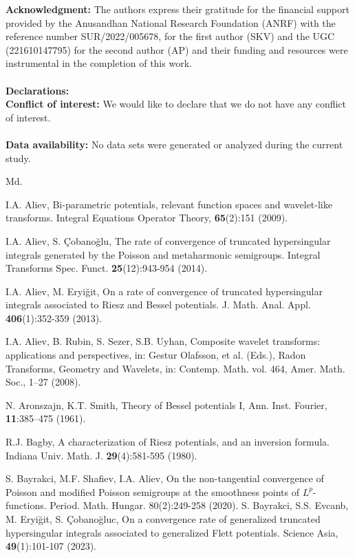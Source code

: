 \documentclass[11pt,a4paper,reqno]{amsproc}
\theoremstyle{definition}
\theoremstyle{remark}
\numberwithin{equation}{section}
\begin{document}
\noindent\textbf{Acknowledgment:}
The authors express their gratitude for the financial support provided by the Anusandhan National Research Foundation (ANRF) with the reference number SUR/2022/005678, for the first author (SKV) and the UGC (221610147795) for the second author (AP) and their funding and resources were instrumental in the completion of this work. \\  
\\
\textbf{Declarations:}\\
\textbf{Conflict of interest:}
We would like to declare that we do not have any conflict of interest.\\ \\
\textbf{Data availability:}
No data sets were generated or analyzed during the current study.
 
\begin{thebibliography}{Md.}

 I.A. Aliev, Bi-parametric potentials, relevant function spaces and wavelet-like transforms. Integral Equations Operator Theory, \textbf{65}(2):151 (2009).

 I.A. Aliev,  S. Çobano\u{g}lu, The rate of convergence of truncated hypersingular integrals generated by the Poisson and metaharmonic semigroups. Integral Transforms Spec. Funct. \textbf{25}(12):943-954 (2014).

 I.A. Aliev,  M. Eryi\u{g}it, On a rate of convergence of truncated hypersingular integrals associated to Riesz and Bessel potentials. J. Math. Anal. Appl. \textbf{406}(1):352-359 (2013).

 I.A. Aliev, B. Rubin, S. Sezer, S.B. Uyhan, Composite wavelet transforms: applications and perspectives, in: Gestur Olafsson, et al. (Eds.), Radon Transforms, Geometry and Wavelets, in: Contemp. Math. vol. 464, Amer. Math. Soc.,   1–27 (2008).

N. Aronszajn, K.T. Smith, Theory of Bessel potentials I, Ann. Inst. Fourier, \textbf{11}:385–475 (1961).

R.J. Bagby,  A characterization of Riesz potentials, and an inversion formula. Indiana Univ. Math. J. \textbf{29}(4):581-595 (1980).

S. Bayrakci, M.F. Shafiev, I.A. Aliev,  On the non-tangential convergence of Poisson and modified Poisson semigroups at the smoothness points of $L^p$-functions. Period. Math. Hungar. 80(2):249-258 (2020).
S. Bayrakci, S.S. Evcanb, M. Eryi\u{g}it, S. \c{C}obano\u{g}luc,   On a convergence rate of generalized truncated hypersingular integrals associated to generalized Flett potentials. Science Asia, \textbf{49}(1):101-107 (2023).


\end{thebibliography}
\end{document}
